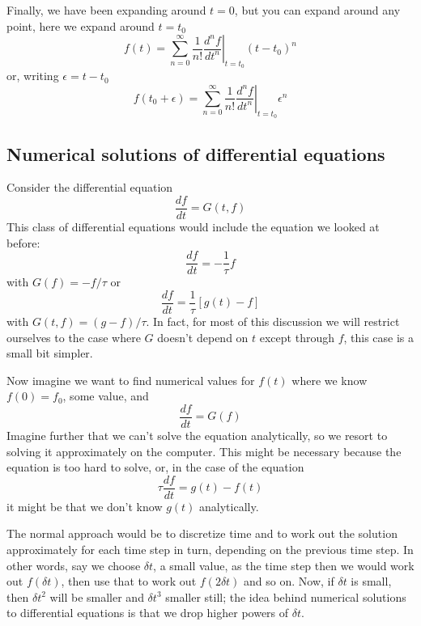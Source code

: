 \documentclass[12pt]{article}
\begin{document}
Finally, we have been expanding around $t=0$, but you can expand around any point, here we expand around $t=t_0$
\begin{equation}
f(t)=\sum_{n=0}^\infty\frac{1}{n!}\left.\frac{d^nf}{dt^n}\right|_{t=t_0}(t-t_0)^n
\end{equation}
or, writing $\epsilon=t-t_0$
\begin{equation}
f(t_0+\epsilon)=\sum_{n=0}^\infty\frac{1}{n!}\left.\frac{d^nf}{dt^n}\right|_{t=t_0}\epsilon^n
\end{equation}

\subsection*{Numerical solutions of differential equations}

Consider the differential equation
\begin{equation}
\frac{df}{dt}=G(t,f)
\end{equation}
This class of differential equations would include the equation we looked at before:
\begin{equation}
\frac{df}{dt}=-\frac{1}{\tau}f
\end{equation}
with $G(f)=-f/\tau$ or
\begin{equation}
\frac{df}{dt}=\frac{1}{\tau}[g(t)-f]
\end{equation}
with $G(t,f)=(g-f)/\tau$. In fact, for most of this discussion we will
restrict ourselves to the case where $G$ doesn't depend on $t$ except
through $f$, this case is a small bit simpler.

Now imagine we want to find numerical values for $f(t)$ where we know
$f(0)=f_0$, some value, and
\begin{equation}
\frac{df}{dt}=G(f)
\end{equation}
Imagine further that we can't solve the equation analytically, so we
resort to solving it approximately on the computer. This might be
necessary because the equation is too hard to solve, or, in the case
of the equation
\begin{equation}
\tau\frac{df}{dt}=g(t)-f(t)
\end{equation}
it might be that we don't know $g(t)$ analytically.

The normal approach would be to discretize time and to work out the
solution approximately for each time step in turn, depending on the
previous time step. In other words, say we choose $\delta t$, a small
value, as the time step then we would work out $f(\delta t)$, then use
that to work out $f(2\delta t)$ and so on. Now, if $\delta t$ is
small, then $\delta t^2$ will be smaller and $\delta t^3$ smaller
still; the idea behind numerical solutions to differential equations
is that we drop higher powers of $\delta t$.
\end{document}
